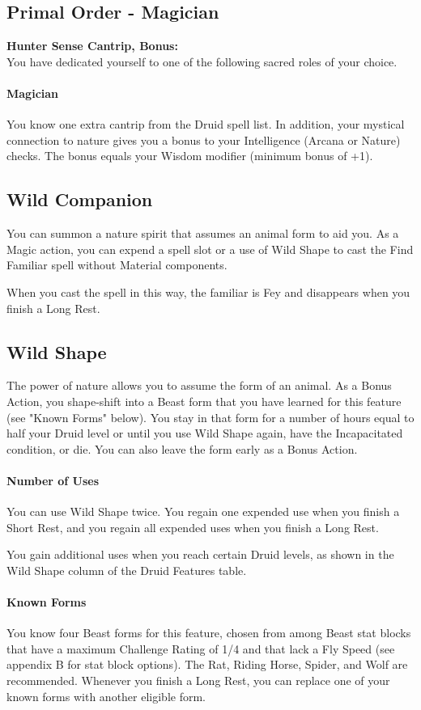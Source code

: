 \documentclass[letterpaper,openany,oneside,twocolumn]{book}
\begin{document}
\subsection*{Primal Order - Magician}
\textbf{Hunter Sense Cantrip, Bonus: \calculateModifier{\WisdomScoreValue}}\\
You have dedicated yourself to one of the following sacred roles of your choice.
\paragraph*{Magician} You know one extra cantrip from the Druid spell list. In addition, your mystical connection to nature gives you a bonus to your Intelligence (Arcana or Nature) checks. The bonus equals your Wisdom modifier (minimum bonus of +1).
\subsection*{Wild Companion}
You can summon a nature spirit that assumes an animal form to aid you. As a Magic action, you can expend a spell slot or a use of Wild Shape to cast the Find Familiar spell without Material components.

When you cast the spell in this way, the familiar is Fey and disappears when you finish a Long Rest.
\subsection*{Wild Shape}
The power of nature allows you to assume the form of an animal. As a Bonus Action, you shape-shift into a Beast form that you have learned for this feature (see "Known Forms" below). You stay in that form for a number of hours equal to half your Druid level or until you use Wild Shape again, have the Incapacitated condition, or die. You can also leave the form early as a Bonus Action.
\paragraph*{Number of Uses} You can use Wild Shape twice. You regain one expended use when you finish a Short Rest, and you regain all expended uses when you finish a Long Rest.

You gain additional uses when you reach certain Druid levels, as shown in the Wild Shape column of the Druid Features table.
\paragraph*{Known Forms} You know four Beast forms for this feature, chosen from among Beast stat blocks that have a maximum Challenge Rating of 1/4 and that lack a Fly Speed (see appendix B for stat block options). The Rat, Riding Horse, Spider, and Wolf are recommended. Whenever you finish a Long Rest, you can replace one of your known forms with another eligible form.
\end{document}
